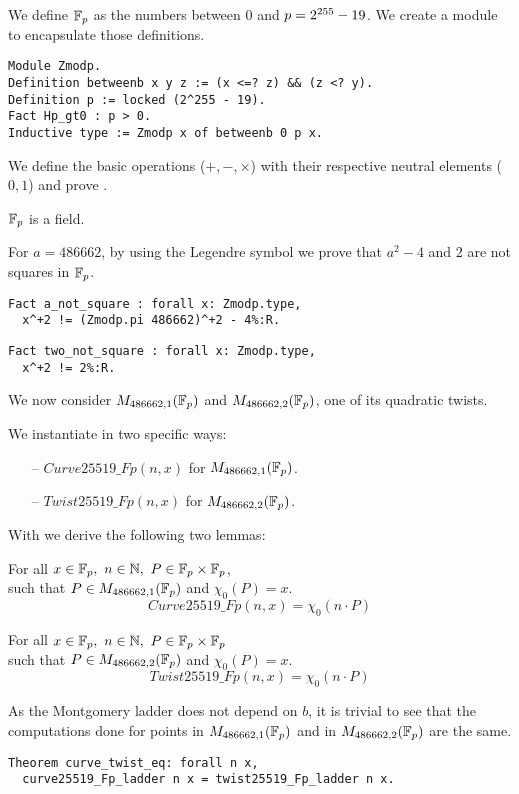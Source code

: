 We define $\mathbb{F}_{p}$ as the numbers between $0$ and $p = 2^{255}-19$.
We create a  module to encapsulate those definitions.
\begin{lstlisting}[language=Coq]
Module Zmodp.
Definition betweenb x y z := (x <=? z) && (z <? y).
Definition p := locked (2^255 - 19).
Fact Hp_gt0 : p > 0.
Inductive type := Zmodp x of betweenb 0 p x.
\end{lstlisting}

We define the basic operations ($+, -, \times$) with their respective neutral
elements ($0, 1$) and prove .
\begin{lemma}
  \label{lemma:Zmodp_field}
  $\mathbb{F}_{p}$ is a field.
\end{lemma}
For $a = 486662$, by using the Legendre symbol we prove that
$a^2 - 4$ and $2$ are not squares in $\mathbb{F}_{p}$.
\begin{lstlisting}[language=Coq,belowskip=-0.25 \baselineskip]
Fact a_not_square : forall x: Zmodp.type,
  x^+2 != (Zmodp.pi 486662)^+2 - 4%:R.
\end{lstlisting}
\begin{lstlisting}[language=Coq,label=two_not_square,belowskip=-0.1 \baselineskip]
Fact two_not_square : forall x: Zmodp.type,
  x^+2 != 2%:R.
\end{lstlisting}
We now consider $M_{486662,1}(\mathbb{F}_{p})$ and $M_{486662,2}(\mathbb{F}_{p})$, one of its quadratic twists.
\begin{dfn}
  We instantiate  in two specific ways:
  \begin{itemize}
    \item[--] $Curve25519\_Fp(n,x)$ for $M_{486662,1}(\mathbb{F}_{p})$.
    \item[--] $Twist25519\_Fp(n,x)$ for $M_{486662,2}(\mathbb{F}_{p})$.
  \end{itemize}
\end{dfn}

With  we derive the following two lemmas:
\begin{lemma}
  For all $x \in \mathbb{F}_{p},\ n \in \mathbb{N},\ P \in \mathbb{F}_{p} \times \mathbb{F}_{p}$,\\
  such that $P \in M_{486662,1}(\mathbb{F}_{p})$ and $\chi_0(P) = x$.
  $$Curve25519\_Fp(n,x) = \chi_0(n \cdot P)$$
\end{lemma}
\begin{lemma}
  For all $x \in \mathbb{F}_{p},\ n \in \mathbb{N},\ P \in \mathbb{F}_{p} \times \mathbb{F}_{p}$\\
  such that $P \in M_{486662,2}(\mathbb{F}_{p})$ and $\chi_0(P) = x$.
  $$Twist25519\_Fp(n,x) = \chi_0(n \cdot P)$$
\end{lemma}
As the Montgomery ladder does not depend on $b$, it is trivial to
see that the computations done for points in $M_{486662,1}(\mathbb{F}_{p})$ and in
$M_{486662,2}(\mathbb{F}_{p})$ are the same.
\begin{lstlisting}[language=Coq]
Theorem curve_twist_eq: forall n x,
  curve25519_Fp_ladder n x = twist25519_Fp_ladder n x.
\end{lstlisting}

